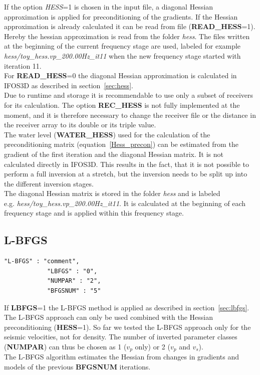 If the option \textit{HESS}=1 is chosen in the input file, a diagonal Hessian approximation is applied for preconditioning of the gradients. If the Hessian approximation is already calculated it can be read from file (\textbf{READ\_HESS}=1). Hereby the hessian approximation is read from the folder \textit{hess}. The files written at the beginning of the current frequency stage are used, labeled for example \textit{hess/toy\_hess.vp\_200.00Hz\_it11} when the new frequency stage started with iteration 11. \\
For \textbf{READ\_HESS}=0 the diagonal Hessian approximation is calculated in IFOS3D as described in section~\ref{sec:hess}.\\
Due to runtime and storage it is recommendable to use only a subset of receivers for its calculation. The option \textbf{REC\_HESS} is not fully implemented at the moment, and it is therefore necessary to change the receiver file or the distance in the receiver array to its double or its triple value. \\
The water level (\textbf{WATER\_HESS}) used for the calculation of the preconditioning matrix (equation~\ref{Hess_precon}) can be estimated from the gradient of the first iteration and the diagonal Hessian matrix. It is not calculated directly in IFOS3D. This results in the fact, that it is not possible to perform a full inversion at a stretch, but the inversion needs to be split up into the different inversion stages.\\
The diagonal Hessian matrix is stored in the folder \textit{hess} and is labeled \\e.g. \textit{hess/toy\_hess.vp\_200.00Hz\_it11}. It is calculated at the beginning of each frequency stage and is applied within this frequency stage.
\subsection{L-BFGS}
\begin{verbatim}
"L-BFGS" : "comment",
			"LBFGS" : "0",
			"NUMPAR" : "2",
			"BFGSNUM" : "5"
\end{verbatim}

If \textbf{LBFGS}=1 the L-BFGS method is applied as described in section~\ref{sec:lbfgs}. The L-BFGS approach can only be used combined with the Hessian preconditioning (\textbf{HESS}=1). So far we tested the L-BFGS approach only for the seismic velocities, not for density. The number of inverted parameter classes (\textbf{NUMPAR}) can thus be chosen as 1 ($v_p$ only) or 2 ($v_p$ and $v_s$).\\
The L-BFGS algorithm estimates the Hessian from changes in gradients and models of the previous \textbf{BFGSNUM} iterations. 

